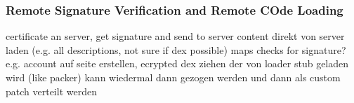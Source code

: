 \subsubsection{Remote Signature Verification and Remote COde Loading}\label{subsection:external-remote}
certificate an server, get signature and send to server\newline
content direkt von server laden (e.g. all descriptions, not sure if dex possible)\newline
maps checks for signature?\newline
e.g. account auf seite erstellen, ecrypted dex ziehen der von loader stub geladen wird (like packer)
kann wiedermal dann gezogen werden und dann als custom patch verteilt werden\newline
